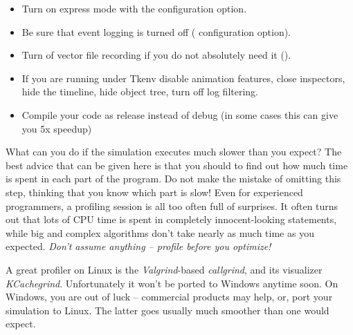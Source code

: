 \begin{itemize}
  \item Turn on express mode with the  configuration option.
  \item Be sure that event logging is turned off ( configuration option).
  \item Turn of vector file recording if you do not absolutely need it ().
  \item If you are running under Tkenv disable animation features, close inspectors,
        hide the timeline, hide object tree, turn off log filtering.
  \item Compile your code as release instead of debug (in some cases this can give you 5x speedup)
\end{itemize}


What can you do if the simulation executes much slower than you expect?
The best advice that can be given here is that you should
 to find out how much time is spent in each
part of the program. Do not make the mistake of omitting this step,
thinking that you know which part is slow! Even for experienced
programmers, a profiling session is all too often full of surprises.
It often turns out that lots of CPU time is spent in completely
innocent-looking statements, while big and complex algorithms
don't take nearly as much time as you expected. \textit{Don't assume anything
-- profile before you optimize!}

A great profiler on Linux is the \textit{Valgrind}-based
\textit{callgrind}, and its visualizer \textit{KCachegrind}.
Unfortunately it won't be ported to Windows anytime soon.
On Windows, you are out of luck -- commercial products may help, or,
port your simulation to Linux. The latter goes usually much smoother
than one would expect.


%
%
%

